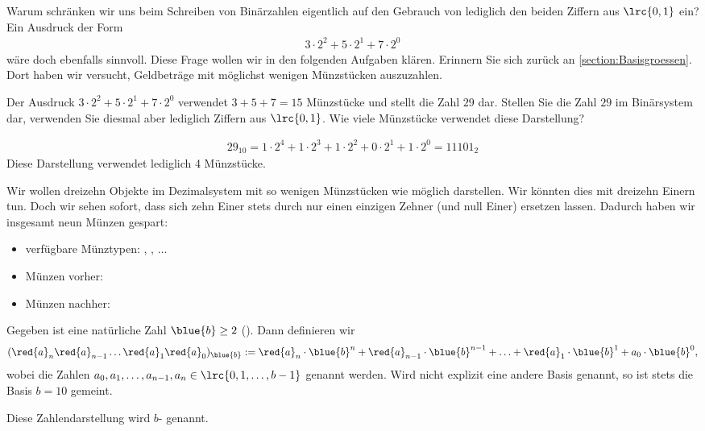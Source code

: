 Warum schränken wir uns beim Schreiben von Binärzahlen eigentlich auf den Gebrauch von lediglich den beiden Ziffern aus
$\lrc{0,1}$ ein? Ein Ausdruck der Form
\begin{align*}
	3\cdot 2^2 + 5\cdot 2^1 + 7\cdot 2^0
\end{align*}
wäre doch ebenfalls sinnvoll. Diese Frage wollen wir in den folgenden Aufgaben klären. Erinnern Sie sich zurück an \cref{section:Basisgroessen}.
Dort haben wir versucht, Geldbeträge mit möglichst wenigen Münzstücken auszuzahlen.

\begin{myexercise}
	Der Ausdruck $3\cdot 2^2 + 5\cdot 2^1 + 7\cdot 2^0$ verwendet $3+5+7 = 15$ Münzstücke und stellt die Zahl $29$ dar.
	Stellen Sie die Zahl $29$ im Binärsystem dar, verwenden Sie diesmal aber lediglich Ziffern aus $\lrc{0,1}$. Wie viele
	Münzstücke verwendet diese Darstellung?
	\begin{myanswer}
		\begin{align*}
			29_{10} = 1\cdot 2^4 + 1\cdot 2^3 + 1\cdot 2^2 + 0\cdot 2^1 + 1\cdot 2^0 = 11101_2
		\end{align*}
		Diese Darstellung verwendet lediglich 4 Münzstücke.
	\end{myanswer}
\end{myexercise}

\begin{myexample}\label{myexample:ersetzen}
Wir wollen dreizehn Objekte im Dezimalsystem mit so wenigen Münzstücken wie möglich darstellen. Wir könnten dies mit
dreizehn Einern tun. Doch wir sehen sofort, dass sich zehn Einer stets durch nur einen einzigen Zehner (und null
Einer) ersetzen lassen. Dadurch haben wir insgesamt neun Münzen gespart:
\begin{itemize}
	\item verfügbare Münztypen: , , $\ldots$
	\item Münzen vorher:
	\item Münzen nachher: 
\end{itemize}
\end{myexample}

\begin{mydefinition}
\label{mydefinition:badisch}
Gegeben ist eine natürliche Zahl $\blue{b}\geq 2$ (). Dann definieren wir
\begin{align*}
	(\red{a}_{n}\red{a}_{n-1}\ldots \red{a}_{1}\red{a}_{0})_{\blue{b}} := \red{a}_n\cdot \blue{b}^n + \red{a}_{n-1}\cdot \blue{b}^{n-1} + \ldots +\red{a}_1\cdot \blue{b}^1 + a_0\cdot
	\blue{b}^0,
\end{align*}
wobei die Zahlen $a_{0}, a_{1},\ldots, a_{n-1}, a_{n}\in\lrc{0,1,\ldots,b-1}$  genannt werden. Wird
nicht explizit eine andere Basis genannt, so ist stets die Basis $b=10$ gemeint.

Diese Zahlendarstellung wird $b$- genannt.
\end{mydefinition}

